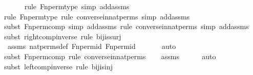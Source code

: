\begin{isabellebody}
\ \ \ \ \ \isamarkupfalse%
{\isacharparenleft}{\kern0pt}rule\ Fn{\isacharunderscore}{\kern0pt}perm{\isacharprime}{\kern0pt}{\isacharunderscore}{\kern0pt}type{\isacharcomma}{\kern0pt}\ simp\ add{\isacharcolon}{\kern0pt}assms{\isacharparenright}{\kern0pt}\isanewline
\ \ \ \ \isamarkupfalse%
{\isacharparenleft}{\kern0pt}rule\ Fn{\isacharunderscore}{\kern0pt}perm{\isacharprime}{\kern0pt}{\isacharunderscore}{\kern0pt}type{\isacharcomma}{\kern0pt}\ rule\ converse{\isacharunderscore}{\kern0pt}in{\isacharunderscore}{\kern0pt}nat{\isacharunderscore}{\kern0pt}perms{\isacharcomma}{\kern0pt}\ simp\ add{\isacharcolon}{\kern0pt}assms{\isacharparenright}{\kern0pt}\isanewline
\ \ \ \isamarkupfalse%
{\isacharparenleft}{\kern0pt}subst\ Fn{\isacharunderscore}{\kern0pt}perm{\isacharprime}{\kern0pt}{\isacharunderscore}{\kern0pt}comp{\isacharcomma}{\kern0pt}\ simp\ add{\isacharcolon}{\kern0pt}assms{\isacharcomma}{\kern0pt}\ rule\ converse{\isacharunderscore}{\kern0pt}in{\isacharunderscore}{\kern0pt}nat{\isacharunderscore}{\kern0pt}perms{\isacharcomma}{\kern0pt}\ simp\ add{\isacharcolon}{\kern0pt}assms{\isacharparenright}{\kern0pt}\isanewline
\ \ \ \isamarkupfalse%
{\isacharparenleft}{\kern0pt}subst\ right{\isacharunderscore}{\kern0pt}comp{\isacharunderscore}{\kern0pt}inverse{\isacharcomma}{\kern0pt}\ rule\ bij{\isacharunderscore}{\kern0pt}is{\isacharunderscore}{\kern0pt}surj{\isacharparenright}{\kern0pt}\isanewline
\ \ \isamarkupfalse%
\ assms\ nat{\isacharunderscore}{\kern0pt}perms{\isacharunderscore}{\kern0pt}def\ Fn{\isacharunderscore}{\kern0pt}perm{\isacharunderscore}{\kern0pt}id\ Fn{\isacharunderscore}{\kern0pt}perm{\isacharprime}{\kern0pt}{\isacharunderscore}{\kern0pt}id\ \isanewline
\ \ \ \ \isamarkupfalse%
\ auto{\isacharbrackleft}{\kern0pt}{}{\isacharbrackright}{\kern0pt}\isanewline
\ \ \isamarkupfalse%
{\isacharparenleft}{\kern0pt}subst\ Fn{\isacharunderscore}{\kern0pt}perm{\isacharprime}{\kern0pt}{\isacharunderscore}{\kern0pt}comp{\isacharcomma}{\kern0pt}\ rule\ converse{\isacharunderscore}{\kern0pt}in{\isacharunderscore}{\kern0pt}nat{\isacharunderscore}{\kern0pt}perms{\isacharparenright}{\kern0pt}\isanewline
\ \ \isamarkupfalse%
\ assms\isanewline
\ \ \ \ \isamarkupfalse%
\ auto{\isacharbrackleft}{\kern0pt}{}{\isacharbrackright}{\kern0pt}\isanewline
\ \ \isamarkupfalse%
{\isacharparenleft}{\kern0pt}subst\ left{\isacharunderscore}{\kern0pt}comp{\isacharunderscore}{\kern0pt}inverse{\isacharcomma}{\kern0pt}\ rule\ bij{\isacharunderscore}{\kern0pt}is{\isacharunderscore}{\kern0pt}inj{\isacharparenright}{\kern0pt}\isanewline

\end{isabellebody}
